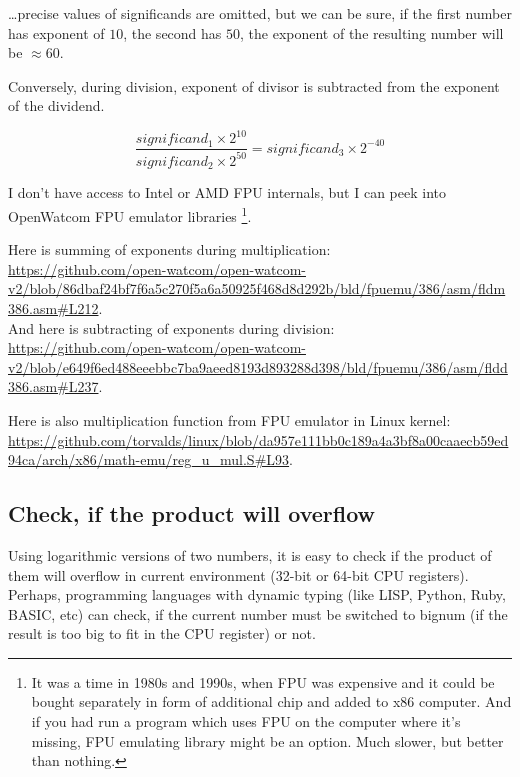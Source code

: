 \dots precise values of significands are omitted, but we can be sure, if the first number has exponent of $10$, the second has $50$,
the exponent of the resulting number will be $\approx 60$.

Conversely, during division, exponent of divisor is subtracted from the exponent of the dividend.

\begin{equation}
\frac{significand_{1} \times 2^{10}}{significand_{2} \times 2^{50}} = significand_{3} \times 2^{-40}
\end{equation}

I don't have access to Intel or AMD FPU internals, but I can peek into OpenWatcom FPU emulator libraries
\footnote{It was a time in 1980s and 1990s, when FPU was expensive and it could be bought separately 
in form of additional chip and added to x86 computer.
And if you had run a program which uses FPU on the computer where it's missing, FPU emulating library might be an option.
Much slower, but better than nothing.}.

Here is summing of exponents during multiplication:\\
\url{https://github.com/open-watcom/open-watcom-v2/blob/86dbaf24bf7f6a5c270f5a6a50925f468d8d292b/bld/fpuemu/386/asm/fldm386.asm\#L212}.\\
And here is subtracting of exponents during division:\\
\url{https://github.com/open-watcom/open-watcom-v2/blob/e649f6ed488eeebbc7ba9aeed8193d893288d398/bld/fpuemu/386/asm/fldd386.asm\#L237}.

Here is also multiplication function from FPU emulator in Linux kernel:
\url{https://github.com/torvalds/linux/blob/da957e111bb0c189a4a3bf8a00caaecb59ed94ca/arch/x86/math-emu/reg_u_mul.S\#L93}.

\subsection{Check, if the product will overflow}

Using logarithmic versions of two numbers, it is easy to check if the product of them will overflow in current environment (32-bit or 64-bit CPU registers).
Perhaps, programming languages with dynamic typing (like LISP, Python, Ruby, BASIC, etc) can check, 
if the current number must be switched to bignum (if the result is too big to fit in the CPU register) or not.


